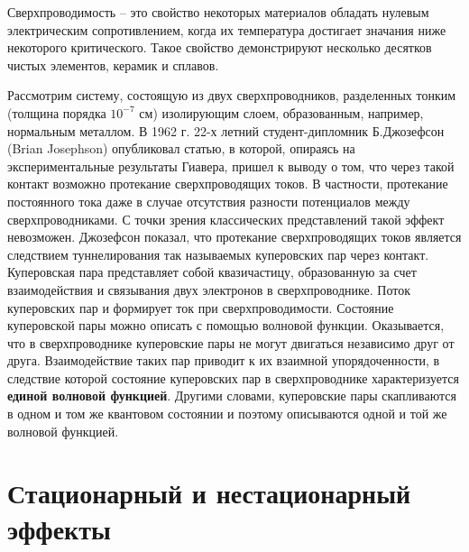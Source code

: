 
Сверхпроводимость -- это свойство некоторых материалов обладать 
нулевым электрическим сопротивлением, когда их температура достигает 
значания ниже некоторого критического. Такое свойство демонстрируют несколько десятков чистых элементов, керамик и сплавов.

Рассмотрим систему, состоящую из двух сверхпроводников, разделенных 
тонким (толщина порядка $10^{-7}$ см) изолирующим слоем, образованным, например, нормальным металлом. В 1962 г. 22-х летний студент-дипломник 
Б.Джозефсон (Brian Josephson) опубликовал статью, в которой, опираясь на
экспериментальные результаты Гиавера, пришел к выводу о том, что через
такой контакт возможно протекание сверхпроводящих токов. В частности,
протекание постоянного тока даже в случае отсутствия разности потенциалов
между сверхпроводниками. С точки зрения классических представлений такой
эффект невозможен. Джозефсон показал, что протекание сверхпроводящих
токов является следствием туннелирования так называемых куперовских пар
через контакт. Куперовская пара представляет собой квазичастицу,
образованную за счет взаимодействия и связывания двух электронов в
сверхпроводнике. Поток куперовских пар и формирует ток при
сверхпроводимости. Состояние куперовской пары можно описать с помощью
волновой функции. Оказывается, что в сверхпроводнике куперовские пары не
могут двигаться независимо друг от друга. Взаимодействие таких пар приводит
к их взаимной упорядоченности, в следствие которой состояние куперовских
пар в сверхпроводнике характеризуется \textbf{единой волновой функцией}. Другими
словами, куперовские пары скапливаются в одном и том же квантовом
состоянии и поэтому описываются одной и той же волновой функцией.
\section{Стационарный и нестационарный эффекты}%
\label{sec:11.1}

